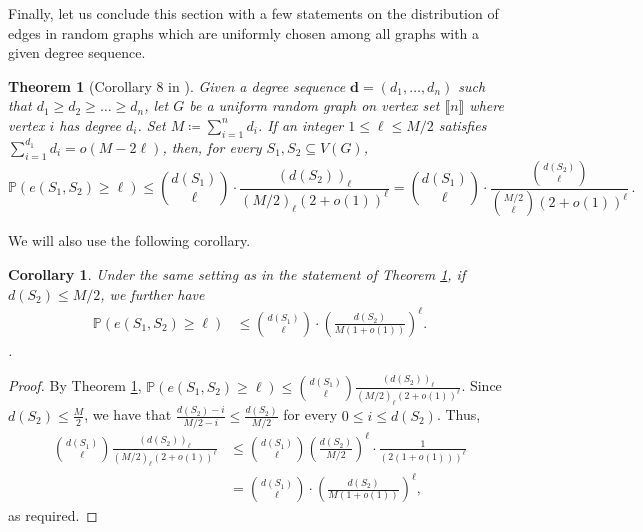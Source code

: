 \documentclass[notitlepage]{scrartcl}
\newcommand{\br}[1]{\llbracket{#1}\rrbracket}
\newtheorem{theorem}{Theorem}
\newtheorem{corollary}[thm]{Corollary}
\begin{document}
Finally, let us conclude this section with a few statements on the distribution of edges in random graphs which are uniformly chosen among all graphs with a given degree sequence.
\begin{theorem}[Corollary 8 in \cite{gao2023subgraph}]\label{th:gao}
    Given a degree sequence $\mathbf{d} = (d_1, \dots, d_n)$ such that $d_1 \ge d_2 \ge \dots \ge d_n$, let $G$ be a uniform random graph on vertex set $\br{n}$ where vertex $i$ has degree $d_i$. Set $M \coloneqq \sum_{i=1}^{n} d_i$. If an integer $1 \le \ell \le M/2$ satisfies $\sum_{i=1}^{d_1} d_i = o(M - 2\ell)$, then, for every $S_1, S_2 \subseteq V(G)$,
    \[
        \mathbb{P}\left(e(S_1, S_2) \ge \ell\right) \le \binom{d(S_1)}{\ell} \cdot \frac{(d(S_2))_\ell}{(M/2)_\ell (2 + o(1))^\ell} = \binom{d(S_1)}{\ell} \cdot \frac{\binom{d(S_2)}{\ell}}{\binom{M/2}{\ell} (2 + o(1))^\ell}\,.
    \]
\end{theorem}
We will also use the following corollary.
\begin{corollary}\label{cor: gao}
Under the same setting as in the statement of Theorem \ref{th:gao}, if $d(S_2)\le M/2$, we further have
    \begin{align*}
        \mathbb{P}\left(e(S_1, S_2) \ge \ell\right) &\le \binom{d(S_1)}{\ell} \cdot \left(\frac{d(S_2)}{M (1 + o(1))}\right)^\ell.
    \end{align*}. 
\end{corollary}
\begin{proof}
By Theorem \ref{th:gao}, $\mathbb{P}\left(e(S_1, S_2) \ge \ell\right) \le\binom{d(S_1)}{\ell}\frac{(d(S_2))_\ell}{(M/2)_\ell (2 + o(1))^\ell}$. Since $d(S_2)\le \frac{M}{2}$, we have that $\frac{d(S_2)-i}{M/2-i}\le \frac{d(S_2)}{M/2}$ for every $0\le i \le d(S_2)$. Thus,
\begin{align*}
\binom{d(S_1)}{\ell}\frac{(d(S_2))_\ell}{(M/2)_\ell (2 + o(1))^\ell}&\le \binom{d(S_1)}{\ell}\left(\frac{d(S_2)}{M/2}\right)^{\ell}\cdot \frac{1}{(2(1+o(1)))^{\ell}}\\&=\binom{d(S_1)}{\ell} \cdot \left(\frac{d(S_2)}{M (1 + o(1))}\right)^\ell,
\end{align*}
as required.
\end{proof}
\end{document}
